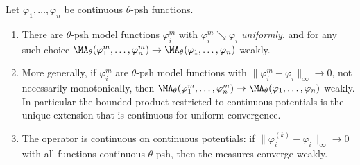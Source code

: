 \begin{proposition}
\label{prop:ch24-continuous-uniform}
Let $\varphi_1,\ldots,\varphi_n$ be continuous $\theta$-psh functions.
\begin{enumerate}
\item\label{itm:ch24-cu:seq} There are $\theta$-psh model functions
 $\varphi_i^m$ with $\varphi_i^m\searrow\varphi_i$ \emph{uniformly}, and
 for any such choice
 $\MA_\theta(\varphi_1^m,\ldots,\varphi_n^m)\to
   \MA_\theta(\varphi_1,\ldots,\varphi_n)$ weakly.
\item\label{itm:ch24-cu:unif} More generally, if $\varphi_i^m$ are
 $\theta$-psh model functions with
 $\|\varphi_i^m-\varphi_i\|_\infty\to0$, not necessarily monotonically,
 then $\MA_\theta(\varphi_1^m,\ldots,\varphi_n^m)\to
 \MA_\theta(\varphi_1,\ldots,\varphi_n)$ weakly.  In particular the
 bounded product restricted to continuous potentials is the unique
 extension that is continuous for uniform convergence.
\item\label{itm:ch24-cu:cont} The operator is continuous on continuous
 potentials: if $\|\varphi_i^{(k)}-\varphi_i\|_\infty\to0$ with all
 functions continuous $\theta$-psh, then the measures converge weakly.
\end{enumerate}
\end{proposition}

